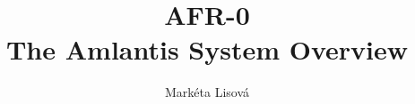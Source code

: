 \documentclass[12pt,a4paper,twoside,titlepage]{book}
\begin{document}
\frontmatter
\title{AFR-0\\ \large The Amlantis System Overview}
\renewcommand{\docversion}{0.11}
\author{Markéta Lisová}
\maketitle
\clearemptydoublepage
\dominitoc

\tableofcontents

\mainmatter
\sloppy



%
\end{document}
